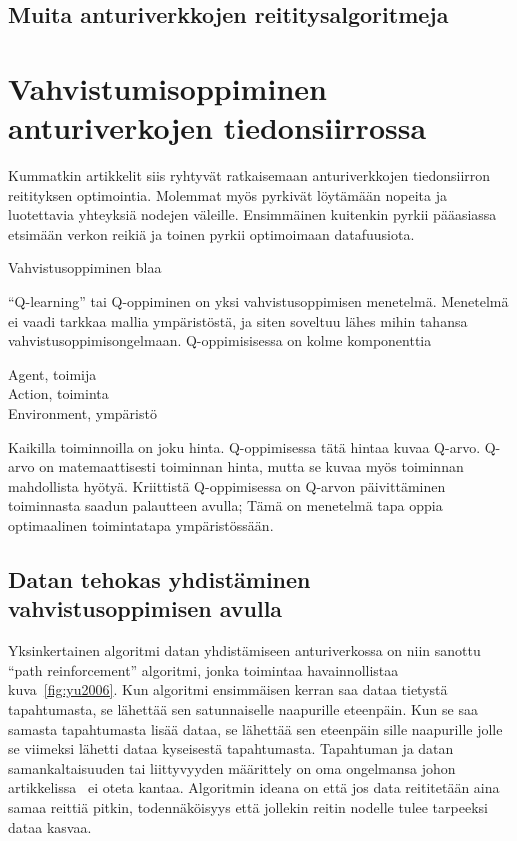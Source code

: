 
\subsection{Muita anturiverkkojen reititysalgoritmeja}

\section{Vahvistumisoppiminen anturiverkojen tiedonsiirrossa}

Kummatkin artikkelit siis ryhtyvät ratkaisemaan anturiverkkojen tiedonsiirron
reitityksen optimointia. Molemmat myös pyrkivät löytämään nopeita ja
luotettavia yhteyksiä nodejen väleille. Ensimmäinen kuitenkin pyrkii pääasiassa
etsimään verkon reikiä ja toinen pyrkii optimoimaan datafuusiota.


Vahvistusoppiminen blaa

``Q-learning'' tai Q-oppiminen on yksi vahvistusoppimisen menetelmä. Menetelmä
ei vaadi tarkkaa mallia ympäristöstä, ja siten soveltuu lähes mihin tahansa
vahvistusoppimisongelmaan. Q-oppimisisessa on kolme komponenttia
\begin{description}
  \item[Agent, toimija] 
  \item[Action, toiminta] 
  \item[Environment, ympäristö] 
\end{description}

Kaikilla toiminnoilla on joku hinta. Q-oppimisessa tätä hintaa kuvaa Q-arvo.
Q-arvo on matemaattisesti toiminnan hinta, mutta se kuvaa myös toiminnan
mahdollista hyötyä. Kriittistä Q-oppimisessa on Q-arvon päivittäminen
toiminnasta saadun palautteen avulla; Tämä on menetelmä tapa oppia optimaalinen
toimintatapa ympäristössään.

\subsection{Datan tehokas yhdistäminen vahvistusoppimisen avulla}

Yksinkertainen algoritmi datan yhdistämiseen anturiverkossa on niin sanottu
``path reinforcement'' algoritmi, jonka toimintaa havainnollistaa
kuva~\ref{fig:yu2006}. Kun algoritmi ensimmäisen kerran saa dataa tietystä
tapahtumasta, se lähettää sen satunnaiselle naapurille eteenpäin. Kun se saa
samasta tapahtumasta lisää dataa, se lähettää sen eteenpäin sille naapurille
jolle se viimeksi lähetti dataa kyseisestä tapahtumasta.  Tapahtuman ja datan
samankaltaisuuden tai liittyvyyden määrittely on oma ongelmansa johon
artikkelissa~\cite{Yu2006} ei oteta kantaa. Algoritmin ideana on että jos data
reititetään aina samaa reittiä pitkin, todennäköisyys että jollekin reitin
nodelle tulee tarpeeksi dataa kasvaa.

